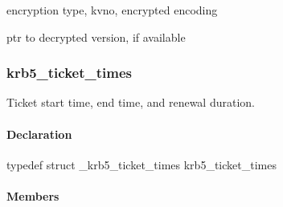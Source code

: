 \documentclass[letterpaper,10pt,english]{sphinxmanual}
\begin{document}

\begin{fulllineitems}
\label{appdev/refs/types/krb5_ticket:c.krb5_ticket.enc_part}
encryption type, kvno, encrypted encoding

\end{fulllineitems}


\begin{fulllineitems}
\label{appdev/refs/types/krb5_ticket:c.krb5_ticket.enc_part2}
ptr to decrypted version, if available

\end{fulllineitems}



\subsubsection{krb5\_ticket\_times}
\label{appdev/refs/types/krb5_ticket_times:krb5-ticket-times}\label{appdev/refs/types/krb5_ticket_times:krb5-ticket-times-struct}\label{appdev/refs/types/krb5_ticket_times::doc}

\begin{fulllineitems}
\label{appdev/refs/types/krb5_ticket_times:c.krb5_ticket_times}
\end{fulllineitems}


Ticket start time, end time, and renewal duration.


\paragraph{Declaration}
\label{appdev/refs/types/krb5_ticket_times:declaration}
typedef struct \_krb5\_ticket\_times  krb5\_ticket\_times


\paragraph{Members}
\label{appdev/refs/types/krb5_ticket_times:members}
\end{document}
